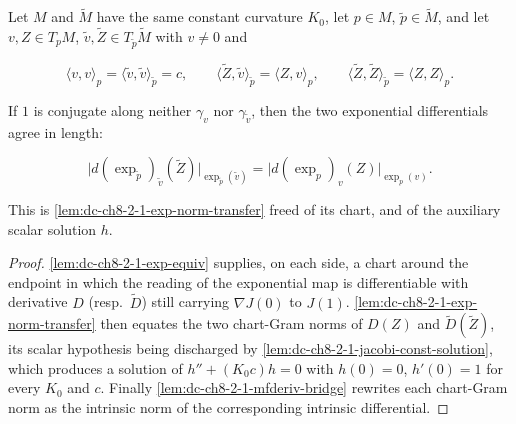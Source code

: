 \begin{lemma}
  \label{lem:dc-ch8-2-1-exp-norm-transfer-mfderiv}


  Let $M$ and $\tilde M$ have the same constant curvature $K_0$, let $p\in M$, $\tilde p\in\tilde M$,
  and let $v,Z\in T_pM$, $\tilde v,\tilde Z\in T_{\tilde p}\tilde M$ with $v\neq 0$ and

  $$
  \langle v,v\rangle_p=\langle\tilde v,\tilde v\rangle_{\tilde p}=c,\qquad
  \langle \tilde Z,\tilde v\rangle_{\tilde p}=\langle Z,v\rangle_p,\qquad
  \langle \tilde Z,\tilde Z\rangle_{\tilde p}=\langle Z,Z\rangle_p .
  $$

  If $1$ is conjugate along neither $\gamma_v$ nor $\gamma_{\tilde v}$, then the two exponential
  differentials agree in length:

  $$
  \big|d(\exp_{\tilde p})_{\tilde v}(\tilde Z)\big|_{\exp_{\tilde p}(\tilde v)}
  =\big|d(\exp_p)_v(Z)\big|_{\exp_p(v)} .
  $$

  This is \cref{lem:dc-ch8-2-1-exp-norm-transfer} freed of its chart, and of the auxiliary scalar
  solution $h$.
\end{lemma}
\begin{proof}

\sketch
  \cref{lem:dc-ch8-2-1-exp-equiv} supplies, on each side, a chart around the endpoint in which the
  reading of the exponential map is differentiable with derivative $D$ (resp.\ $\tilde D$) still
  carrying $\nabla J(0)$ to $J(1)$. \cref{lem:dc-ch8-2-1-exp-norm-transfer} then equates the two
  chart-Gram norms of $D(Z)$ and $\tilde D(\tilde Z)$, its scalar hypothesis being discharged by
  \cref{lem:dc-ch8-2-1-jacobi-const-solution}, which produces a solution of $h''+(K_0c)h=0$ with
  $h(0)=0$, $h'(0)=1$ for every $K_0$ and $c$. Finally
  \cref{lem:dc-ch8-2-1-mfderiv-bridge} rewrites each chart-Gram norm as the intrinsic norm of the
  corresponding intrinsic differential.
\end{proof}


